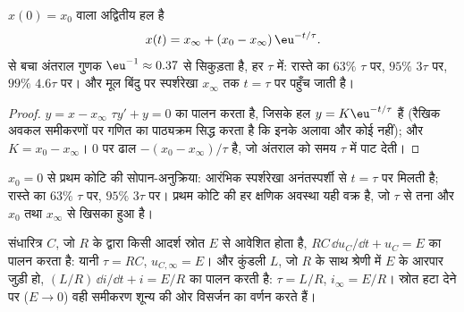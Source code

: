 \begin{theorem}[हल]\label{thm:b1:transient-regimes:firstorder}
$x(0) = x_0$ वाला अद्वितीय हल है
\[
x(t) = x_\infty + (x_0 - x_\infty)\,\eu^{-t/\tau} .
\]
 से बचा अंतराल गुणक $\eu^{-1} \approx
0.37$ से सिकुड़ता है, हर $\tau$ में: रास्ते का $63\%$ $\tau$ पर, $95\%$
$3\tau$ पर, $99\%$ $4.6\tau$ पर। और मूल बिंदु पर स्पर्शरेखा $x_\infty$ तक
$t = \tau$ पर पहुँच जाती है।
\end{theorem}

\begin{proof}
$y = x - x_\infty$ $\tau y' + y = 0$ का पालन करता है, जिसके हल
$y = K\eu^{-t/\tau}$ हैं (रैखिक अवकल समीकरणों पर गणित का पाठ्यक्रम सिद्ध करता
है कि इनके अलावा और कोई नहीं); और $K = x_0 - x_\infty$। $0$ पर ढाल
$-(x_0 - x_\infty)/\tau$ है, जो अंतराल को समय
$\tau$ में पाट देती।
\end{proof}

\begin{omfigure}

{\small $x_0 = 0$ से प्रथम कोटि की सोपान-अनुक्रिया: आरंभिक
स्पर्शरेखा अनंतस्पर्शी से $t = \tau$ पर मिलती है; रास्ते का $63\%$ $\tau$ पर,
$95\%$ $3\tau$ पर। प्रथम कोटि की हर क्षणिक अवस्था यही वक्र है, जो
$\tau$ से तना और $x_0$ तथा $x_\infty$ से खिसका हुआ है।}
\end{omfigure}

\begin{proposition}[RC और RL परिपथ]\label{prop:b1:transient-regimes:rcrl}
संधारित्र $C$, जो  $R$ के द्वारा किसी आदर्श स्रोत $E$ से आवेशित होता
है, $RC\,\dd u_C/\dd t + u_C = E$ का पालन करता है: यानी $\tau = RC$, $u_{C,\infty} = E$।
और कुंडली $L$, जो $R$ के साथ श्रेणी में $E$ के आरपार जुड़ी हो,
$(L/R)\,\dd i/\dd t + i =
E/R$ का पालन करती है: $\tau = L/R$, $i_\infty = E/R$। स्रोत हटा देने पर
($E \to 0$) वही समीकरण शून्य की ओर विसर्जन का वर्णन करते हैं।
\end{proposition}

